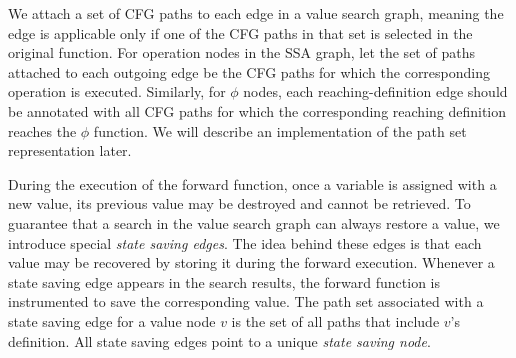We attach a set of CFG paths to each edge in a value search graph, meaning the edge is applicable only if one of the CFG paths in that set is selected in the original function.
For operation nodes in the SSA graph, let the set of paths attached to each outgoing edge be the CFG paths for which the corresponding operation is executed. 
Similarly, for $\phi$ nodes, each reaching-definition edge should be annotated with all CFG paths for which the corresponding reaching definition reaches the $\phi$ function. 
We will describe an implementation of the path set representation later.

During the execution of the forward function, once a variable is assigned with a new value, its previous value may be destroyed and cannot be retrieved. To guarantee that a search in the value search graph can always restore a value, we introduce special \emph{state saving edges}. 
The idea behind these edges is that each value may be recovered by storing it during the forward execution. 
Whenever a state saving edge appears in the search results, the forward function is instrumented to save the corresponding value. 
The path set associated with a state saving edge for a value node $v$ is the set of all paths that include $v$'s definition. All state saving edges point to a unique \emph{state saving node}. %


